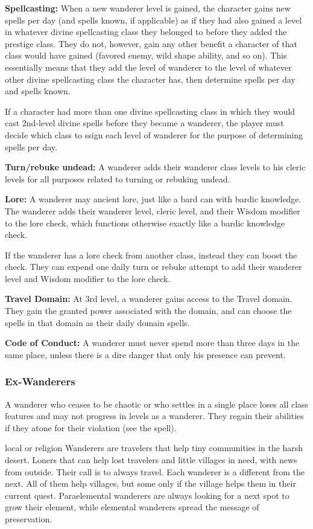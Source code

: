 {
\textbf{Spellcasting:} When a new wanderer level is gained, the character gains new spells per day (and spells known, if applicable) as if they had also gained a level in whatever divine spellcasting class they belonged to before they added the prestige class. They do not, however, gain any other benefit a character of that class would have gained (favored enemy, wild shape ability, and so on). This essentially means that they add the level of wanderer to the level of whatever other divine spellcasting class the character has, then determine spells per day and spells known.

If a character had more than one divine spellcasting class in which they would cast 2nd-level divine spells before they became a wanderer, the player must decide which class to ssign each level of wanderer for the purpose of determining spells per day.

\textbf{Turn/rebuke undead:} A wanderer adds their wanderer class levels to his cleric levels for all purposes related to turning or rebuking undead.

\textbf{Lore:} A wanderer may ancient lore, just like a bard can with bardic knowledge. The wanderer adds their wanderer level, cleric level, and their Wisdom modifier to the lore check, which functions otherwise exactly like a bardic knowledge check.

If the wanderer has a lore check from another class, instead they can boost the check. They can expend one daily turn or rebuke attempt to add their wanderer level and Wisdom modifier to the lore check.

\textbf{Travel Domain:} At 3rd level, a wanderer gains access to the Travel domain. They gain the granted power associated with the domain, and can choose the spells in that domain as their daily domain spells.

\textbf{Code of Conduct:} A wanderer must never spend more than three days in the same place, unless there is a dire danger that only his presence can prevent.

\subsubsection{Ex-Wanderers}
A wanderer who ceases to be chaotic or who settles in a single place loses all class features and may not progress in levels as a wanderer. They regain their abilities if they atone for their violation (see the  spell).
}
{}
{local or religion}
{Wanderers are travelers that help tiny communities in the harsh desert.}
{Loners that can help lost travelers and little villages in need, with news from outside. Their call is to always travel.}
{Each wanderer is a different from the next. All of them help villages, but some only if the village helps them in their current quest. Paraelemental wanderers are always looking for a next spot to grow their element, while elemental wanderers spread the message of preservation.}